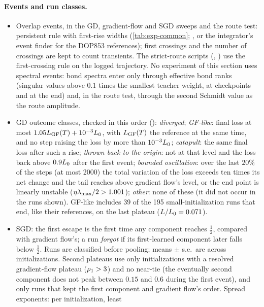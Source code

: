 \paragraph{Events and run classes.}
\begin{itemize}
  \item Overlap events, in the GD, gradient-flow and SGD sweeps and the route test: persistent rule with
    first-rise widths (\cref{tab:exp-common}; , or the integrator's event finder for the
    DOP853 references); first crossings and the number of crossings are kept to count transients. The
    strict-route scripts (, ) use the first-crossing rule on the logged trajectory. No
    experiment of this section uses spectral events: bond spectra enter only through effective bond ranks
    (singular values above $0.1$ times the smallest teacher weight, at checkpoints and at the end) and, in
    the route test, through the second Schmidt value as the route amplitude.
  \item GD outcome classes, checked in this order (): \emph{diverged}; \emph{GF-like}: final
    loss at most $1.05L_{\rm GF}(T)+10^{-3}L_0$, with $L_{\rm GF}(T)$ the reference at the same time, and no
    step raising the loss by more than $10^{-3}L_0$; \emph{catapult}: the same final loss after such a
    rise; \emph{thrown back to the origin}: not at that level and the loss back above $0.9L_0$ after the
    first event; \emph{bounded oscillation}: over the last $20\%$ of the steps (at most 2000) the total
    variation of the loss exceeds ten times its net change and the tail reaches above gradient flow's
    level, or the end point is linearly unstable ($\eta\lambda_{\max}/2>1.001$); \emph{other}: none of these (it
    did not occur in the runs shown). GF-like includes 39 of the 195 small-initialization runs that end,
    like their references, on the last plateau ($L/L_0=0.071$).
  \item SGD: the first escape is the first time any component reaches $\frac12$, compared with gradient
    flow's; a run \emph{forgot} if its first-learned component later falls below $\frac12$. Runs are
    classified before pooling; means $\pm$ s.e.\ are across initializations. Second plateaus use only
    initializations with a resolved gradient-flow plateau ($\rho_{1}>3$) and no near-tie (the eventually
    second component does not peak between $0.15$ and $0.6$ during the first event), and only runs that
    kept the first component and gradient flow's order. Spread exponents: per initialization, least

\end{itemize}
